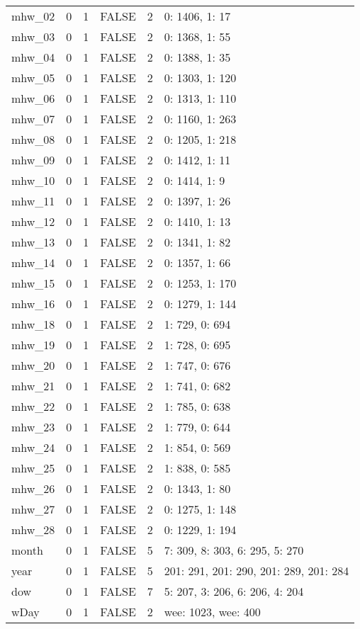 \documentclass[
]{article}
\begin{document}
\begin{longtable}[]{@{}lrrlrl@{}}
mhw\_02 & 0 & 1 & FALSE & 2 & 0: 1406, 1: 17 \\
mhw\_03 & 0 & 1 & FALSE & 2 & 0: 1368, 1: 55 \\
mhw\_04 & 0 & 1 & FALSE & 2 & 0: 1388, 1: 35 \\
mhw\_05 & 0 & 1 & FALSE & 2 & 0: 1303, 1: 120 \\
mhw\_06 & 0 & 1 & FALSE & 2 & 0: 1313, 1: 110 \\
mhw\_07 & 0 & 1 & FALSE & 2 & 0: 1160, 1: 263 \\
mhw\_08 & 0 & 1 & FALSE & 2 & 0: 1205, 1: 218 \\
mhw\_09 & 0 & 1 & FALSE & 2 & 0: 1412, 1: 11 \\
mhw\_10 & 0 & 1 & FALSE & 2 & 0: 1414, 1: 9 \\
mhw\_11 & 0 & 1 & FALSE & 2 & 0: 1397, 1: 26 \\
mhw\_12 & 0 & 1 & FALSE & 2 & 0: 1410, 1: 13 \\
mhw\_13 & 0 & 1 & FALSE & 2 & 0: 1341, 1: 82 \\
mhw\_14 & 0 & 1 & FALSE & 2 & 0: 1357, 1: 66 \\
mhw\_15 & 0 & 1 & FALSE & 2 & 0: 1253, 1: 170 \\
mhw\_16 & 0 & 1 & FALSE & 2 & 0: 1279, 1: 144 \\
mhw\_18 & 0 & 1 & FALSE & 2 & 1: 729, 0: 694 \\
mhw\_19 & 0 & 1 & FALSE & 2 & 1: 728, 0: 695 \\
mhw\_20 & 0 & 1 & FALSE & 2 & 1: 747, 0: 676 \\
mhw\_21 & 0 & 1 & FALSE & 2 & 1: 741, 0: 682 \\
mhw\_22 & 0 & 1 & FALSE & 2 & 1: 785, 0: 638 \\
mhw\_23 & 0 & 1 & FALSE & 2 & 1: 779, 0: 644 \\
mhw\_24 & 0 & 1 & FALSE & 2 & 1: 854, 0: 569 \\
mhw\_25 & 0 & 1 & FALSE & 2 & 1: 838, 0: 585 \\
mhw\_26 & 0 & 1 & FALSE & 2 & 0: 1343, 1: 80 \\
mhw\_27 & 0 & 1 & FALSE & 2 & 0: 1275, 1: 148 \\
mhw\_28 & 0 & 1 & FALSE & 2 & 0: 1229, 1: 194 \\
month & 0 & 1 & FALSE & 5 & 7: 309, 8: 303, 6: 295, 5: 270 \\
year & 0 & 1 & FALSE & 5 & 201: 291, 201: 290, 201: 289, 201: 284 \\
dow & 0 & 1 & FALSE & 7 & 5: 207, 3: 206, 6: 206, 4: 204 \\
wDay & 0 & 1 & FALSE & 2 & wee: 1023, wee: 400 \\
\bottomrule
\end{longtable}
\end{document}
